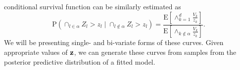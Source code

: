   conditional survival function can be similarly estimated as
  \begin{equation}
    \label{eqn:condsurv2df}
    \text{P}\left(\cap_{l \in \alpha} Z_l > z_l \mid \cap_{l\not\in\alpha} Z_l > z_l\right) =
      \frac{\text{E}\left[\wedge_{k = 1}^d \frac{V_k}{z_k}\right]}{\text{E}\left[\wedge_{k \not\in\alpha}\frac{V_k}{z_k}\right]}.
  \end{equation}
  We will be presenting single- and bi-variate forms of these curves.   Given appropriate values of
  ${\bf z}$, we can generate these curves from samples from the posterior predictive distribution of
  a fitted model.












